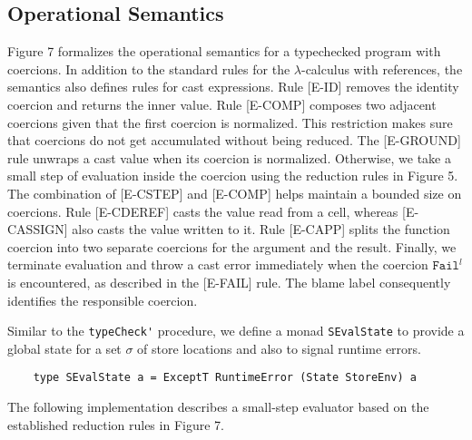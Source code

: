 \subsection{Operational Semantics}
Figure 7 formalizes the operational semantics for a typechecked 
program with coercions. In addition to the standard rules for 
the $\lambda$-calculus with references, the semantics also 
defines rules for cast expressions. Rule  
{\scriptsize{[E-ID]}} removes the identity coercion and 
returns the inner value. 
Rule {\scriptsize{[E-COMP]}} composes two 
adjacent coercions given that the first coercion is normalized. 
This restriction makes sure that coercions do not get accumulated 
without being reduced. 
The {\scriptsize{[E-GROUND]}} rule unwraps a cast value 
when its coercion is normalized. Otherwise, we take a small 
step of evaluation inside the coercion using the reduction rules 
in Figure 5. The combination of {\scriptsize{[E-CSTEP]}} and 
{\scriptsize{[E-COMP]}} helps maintain a bounded size on coercions. 
Rule {\scriptsize{[E-CDEREF]}} casts the value read 
from a cell, whereas {\scriptsize{[E-CASSIGN]}} also casts the value 
written to it. Rule 
{\scriptsize{[E-CAPP]}} splits the function coercion 
into two separate coercions for the argument and the result. 
Finally, we terminate evaluation and throw a cast error 
immediately when the coercion $\texttt{Fail}^l$ is encountered, 
as described in the {\scriptsize{[E-FAIL]}} rule. The blame 
label consequently identifies the responsible coercion.

Similar to the \lstinline{typeCheck'} procedure, we define a 
monad \lstinline{SEvalState} to provide a global state for a set $\sigma$ of 
store locations and also to signal runtime errors.
\begin{lstlisting}
    type SEvalState a = ExceptT RuntimeError (State StoreEnv) a
\end{lstlisting}
The following implementation describes a small-step evaluator 
based on the established reduction rules in Figure 7.



